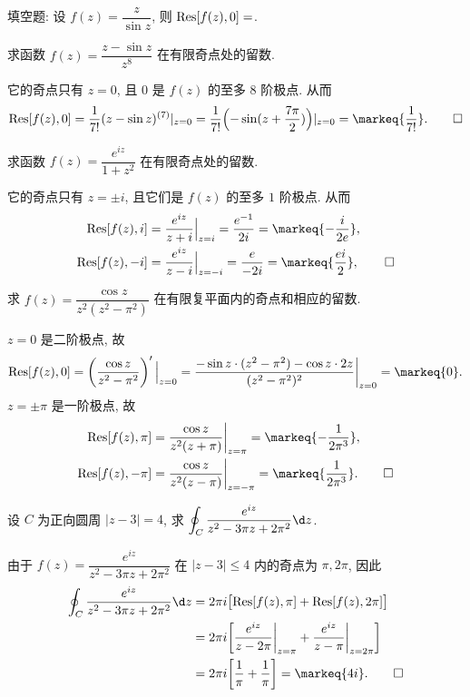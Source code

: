 \begin{exercise}
	填空题: 设 $f(z)=\dfrac{z}{\sin z}$, 则 ${\mathrm{Res}}[f(z),0]=$.
\end{exercise}


\begin{exercise}
	求函数 $f(z)=\dfrac{z-\sin z}{z^8}$ 在有限奇点处的留数.  
\end{exercise}
\begin{solution}
	它的奇点只有 $z=0$, 且 $0$ 是 $f(z)$ 的至多 $8$ 阶极点.
	从而
	\[\Res[f(z),0]=\frac1{7!}(z-\sin z)^{(7)}|_{z=0}
		=\frac1{7!}\Bigl(-\sin(z+\frac{7\pi}2)\Bigr)|_{z=0}=\markeq{\frac1{7!}}.\qedhere\]
\end{solution}


\begin{exercise}
	求函数 $f(z)=\dfrac{e^{iz}}{1+z^2}$ 在有限奇点处的留数.
\end{exercise}
\begin{solution}
	它的奇点只有 $z=\pm i$, 且它们是 $f(z)$ 的至多 $1$ 阶极点.
	从而
	\begin{align*}
		\Res[f(z),i]&=\frac{e^{iz}}{z+i}\Big|_{z=i}=\frac{e^{-1}}{2i}=\markeq{-\frac i{2e}},\\
		\Res[f(z),-i]&=\frac{e^{iz}}{z-i}\Big|_{z=-i}=\frac{e}{-2i}=\markeq{\frac {ei}2},\qedhere
	\end{align*}
\end{solution}


\begin{exercise}
	求 $f(z)=\dfrac{\cos z}{z^2(z^2-\pi^2)}$ 在有限复平面内的奇点和相应的留数.
\end{exercise}
\begin{solution}
	$z=0$ 是二阶极点, 故
	\[\Res[f(z),0]=\left(\frac{\cos z}{z^2-\pi^2}\right)'\Big|_{z=0}=\frac{-\sin z\cdot(z^2-\pi^2)-\cos z\cdot 2z}{(z^2-\pi^2)^2}\bigg|_{z=0}=\markeq{0}.\]
	$z=\pm\pi$ 是一阶极点, 故
	\begin{align*}
		\Res[f(z),\pi]&=\frac{\cos z}{z^2(z+\pi)}\bigg|_{z=\pi}=\markeq{-\frac1{2\pi^3}}, \\
		\Res[f(z),-\pi]&=\frac{\cos z}{z^2(z-\pi)}\bigg|_{z=-\pi}=\markeq{\frac1{2\pi^3}}.\qedhere
	\end{align*}	
\end{solution}


\begin{exercise}
	设 $C$ 为正向圆周 $|z-3|=4$, 求 $\displaystyle\oint_C\frac{e^{iz}}{z^2-3\pi z+2\pi^2}\d z$.
\end{exercise}
\begin{solution}
	由于 $f(z)=\dfrac{e^{iz}}{z^2-3\pi z+2\pi^2}$ 在 $|z-3|\le 4$ 内的奇点为 $\pi,2\pi$, 因此
	\begin{align*}
		\oint_C\frac{e^{iz}}{z^2-3\pi z+2\pi^2}\d z&=2\pi i\bigl[\Res[f(z),\pi]+\Res[f(z),2\pi]\bigr] \\
		&=2\pi i\biggl[\frac{e^{iz}}{z-2\pi}\bigg|_{z=\pi}+\frac{e^{iz}}{z-\pi}\bigg|_{z=2\pi}\biggr] \\
	&=2\pi i\biggl[\frac1\pi+\frac1\pi\biggr]=\markeq{4i}. \qedhere
	\end{align*}
\end{solution}


